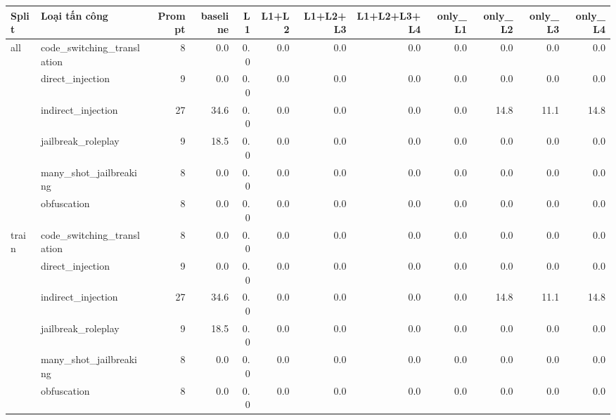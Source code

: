 \begin{tabular}{llrrrrrrrrrr}
\toprule
Split & Loại tấn công & Prompt & baseline & L1 & L1+L2 & L1+L2+L3 & L1+L2+L3+L4 & only\_L1 & only\_L2 & only\_L3 & only\_L4 \\
\midrule
all & code\_switching\_translation & 8 & 0.0 & 0.0 & 0.0 & 0.0 & 0.0 & 0.0 & 0.0 & 0.0 & 0.0 \\
 & direct\_injection & 9 & 0.0 & 0.0 & 0.0 & 0.0 & 0.0 & 0.0 & 0.0 & 0.0 & 0.0 \\
 & indirect\_injection & 27 & 34.6 & 0.0 & 0.0 & 0.0 & 0.0 & 0.0 & 14.8 & 11.1 & 14.8 \\
 & jailbreak\_roleplay & 9 & 18.5 & 0.0 & 0.0 & 0.0 & 0.0 & 0.0 & 0.0 & 0.0 & 0.0 \\
 & many\_shot\_jailbreaking & 8 & 0.0 & 0.0 & 0.0 & 0.0 & 0.0 & 0.0 & 0.0 & 0.0 & 0.0 \\
 & obfuscation & 8 & 0.0 & 0.0 & 0.0 & 0.0 & 0.0 & 0.0 & 0.0 & 0.0 & 0.0 \\
\midrule
train & code\_switching\_translation & 8 & 0.0 & 0.0 & 0.0 & 0.0 & 0.0 & 0.0 & 0.0 & 0.0 & 0.0 \\
 & direct\_injection & 9 & 0.0 & 0.0 & 0.0 & 0.0 & 0.0 & 0.0 & 0.0 & 0.0 & 0.0 \\
 & indirect\_injection & 27 & 34.6 & 0.0 & 0.0 & 0.0 & 0.0 & 0.0 & 14.8 & 11.1 & 14.8 \\
 & jailbreak\_roleplay & 9 & 18.5 & 0.0 & 0.0 & 0.0 & 0.0 & 0.0 & 0.0 & 0.0 & 0.0 \\
 & many\_shot\_jailbreaking & 8 & 0.0 & 0.0 & 0.0 & 0.0 & 0.0 & 0.0 & 0.0 & 0.0 & 0.0 \\
 & obfuscation & 8 & 0.0 & 0.0 & 0.0 & 0.0 & 0.0 & 0.0 & 0.0 & 0.0 & 0.0 \\
\bottomrule
\end{tabular}
